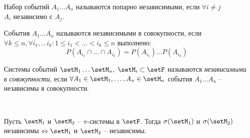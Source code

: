 \begin{definition}
	Набор событий $A_1 \ldots A_n$ называются попарно независимыми, если $\forall i \neq j$ \\
	$A_i$ независимо с $A_j$.
\end{definition}

\begin{definition}
	События $A_1 \ldots A_n$ называются независимыми в совокупности, если $\forall k \leq n, 
	\forall i_1, \ldots i_k : 1 \leq i_1 < \ldots < i_k \leq n$ выполнено:
	\begin{equation*}
		P(A_{i_1} \cap \ldots \cap A_{i_k}) = P(A_{i_1}) \ldots P(A_{i_k})
	\end{equation*}
\end{definition}

\begin{definition}
	Системы событий $\setM_1 \ldots \setM_n, \; \setM_i \subset \setF$ 
	называются \emph{независимыми в совокупности}, 
	если $\forall A_1 \in \setM_1, \ldots, A_n \in \setM_n$ 
	события $A_1 \ldots A_n$ -- независимы в совокупности.
\end{definition}

\begin{lemma}~

	Пусть $\setM_1$ и $\setM_2$ -- $\pi$-системы в $\setF$.
	Тогда $\sigma(\setM_1)$ и $\sigma(\setM_2)$ независимы 
	$\Leftrightarrow \setM_1$ и $\setM_2$ -- независимы.

\end{lemma}

